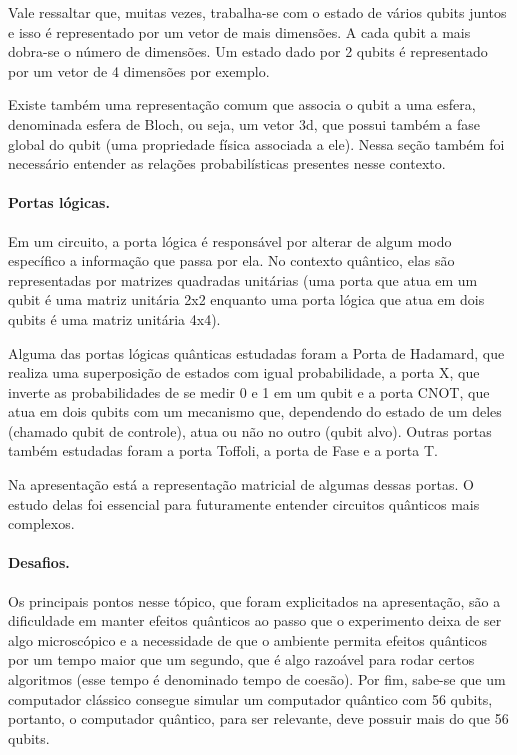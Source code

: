 \documentclass{article}
\begin{document}
        Vale ressaltar que, muitas vezes, trabalha-se com o estado de vários qubits juntos e isso é representado por um vetor de mais dimensões. A cada qubit a mais dobra-se o número de dimensões. Um estado dado por 2 qubits é representado por um vetor de 4 dimensões por exemplo.
        
        Existe também uma representação comum que associa o qubit a uma esfera, denominada esfera de Bloch, ou seja, um vetor 3d, que possui também a fase global do qubit (uma propriedade física associada a ele). Nessa seção também foi necessário entender as relações  probabilísticas presentes nesse contexto.
    
        \paragraph{Portas lógicas.}
        Em um circuito, a porta lógica é responsável por alterar de algum modo específico a informação que passa por ela. No contexto quântico, elas são representadas por matrizes quadradas unitárias (uma porta que atua em um qubit é uma matriz unitária 2x2 enquanto uma porta lógica que atua em dois qubits é uma matriz unitária 4x4).
    
        Alguma das portas lógicas quânticas estudadas foram a Porta de Hadamard, que realiza uma superposição de estados com igual probabilidade, a porta X, que inverte as probabilidades de se medir 0 e 1 em um qubit e a porta CNOT, que atua em dois qubits com um mecanismo que, dependendo do estado de um deles (chamado qubit de controle), atua ou não no outro (qubit alvo). Outras portas também estudadas foram a porta Toffoli, a porta de Fase e a porta T.
    
        Na apresentação está a representação matricial de algumas dessas portas. O estudo delas foi essencial para futuramente entender circuitos quânticos mais complexos.
    
        \paragraph{Desafios.}
        Os principais pontos nesse tópico, que foram explicitados na apresentação, são a dificuldade em manter efeitos quânticos ao passo que o experimento deixa de ser algo microscópico e a necessidade de que o ambiente permita efeitos quânticos por um tempo maior que um segundo, que é algo razoável para rodar certos algoritmos (esse tempo é denominado tempo de coesão). Por fim, sabe-se que um computador clássico consegue simular um computador quântico com 56 qubits, portanto, o computador quântico, para ser relevante, deve possuir mais do que 56 qubits.
\end{document}
